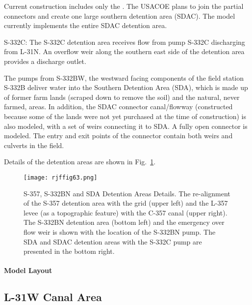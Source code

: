 Current construction includes only the . The USACOE plans to join the partial connectors and create one large southern detention area (SDAC). The model currently implements the entire SDAC detention area.



S-332C: The S-332C detention area receives flow from pump S-332C discharging from L-31N. An overflow weir along the southern east side of the detention area provides a discharge outlet.

The pumps from S-332BW, the westward facing components of the field station S-332B deliver water into the Southern Detention Area (SDA), which is made up of former farm lands (scraped down to remove the soil) and the natural, never farmed, areas.
In addition, the SDAC connector canal/flowway (constructed because some of the lands were not yet purchased at the time of construction) is also modeled, with a set of weirs connecting it to SDA. A fully open connector is modeled.
The entry and exit points of the connector contain both weirs and culverts in the field.

Details of the detention areas are shown in Fig.~\ref{fig:rjffig63}.

\begin{figure}[!h]
  \begin{center}
  \texttt{[image: rjffig63.png]}
  \caption[S-357, S-332BN and SDA Detention Areas Details.]{S-357, S-332BN and SDA Detention Areas Details. The re-alignment of the S-357 detention area with the grid (upper left) and the L-357 levee (as a topographic feature) with the C-357 canal (upper right). The S-332BN detention area (bottom left) and the emergency over  flow weir is shown with the location of the S-332BN pump. The SDA and SDAC detention areas with the S-332C pump are presented in the bottom right.}
  \label{fig:rjffig63}
  \end{center}
\end{figure}


\paragraph{Model Layout}




\clearpage
\subsection{L-31W Canal Area}

